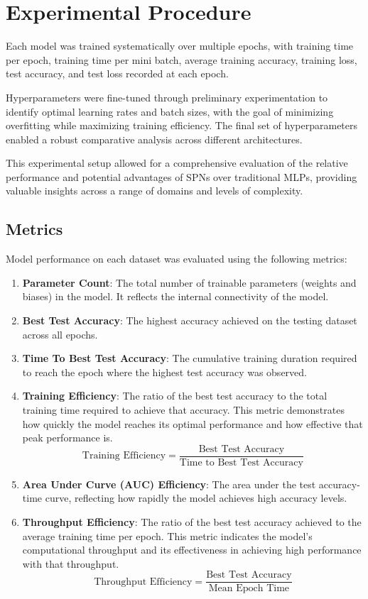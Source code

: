 
\section{Experimental Procedure}

Each model was trained systematically over multiple epochs, with training time per epoch, training time per mini batch, average training accuracy, training loss, test accuracy, and test loss recorded at each epoch.

Hyperparameters were fine-tuned through preliminary experimentation to identify optimal learning rates and batch sizes, with the goal of minimizing overfitting while maximizing training efficiency. The final set of hyperparameters enabled a robust comparative analysis across different architectures.

This experimental setup allowed for a comprehensive evaluation of the relative performance and potential advantages of SPNs over traditional MLPs, providing valuable insights across a range of domains and levels of complexity.

\subsection{Metrics}
Model performance on each dataset was evaluated using the following metrics:
\begin{enumerate}
\item \textbf{Parameter Count}: The total number of trainable parameters (weights and biases) in the model. It reflects the internal connectivity of the model.
\item \textbf{Best Test Accuracy}: The highest accuracy achieved on the testing dataset across all epochs.
\item \textbf{Time To Best Test Accuracy}: The cumulative training duration required to reach the epoch where the highest test accuracy was observed.
\item \textbf{Training Efficiency}: The ratio of the best test accuracy to the total training time required to achieve that accuracy. This metric demonstrates how quickly the model reaches its optimal performance and how effective that peak performance is.
    \[
    \text{Training Efficiency} = \frac{\text{Best Test Accuracy}}{\text{Time to Best Test Accuracy}}
    \]
\item \textbf{Area Under Curve (AUC) Efficiency}: The area under the test accuracy-time curve, reflecting how rapidly the model achieves high accuracy levels.
\item \textbf{Throughput Efficiency}: The ratio of the best test accuracy achieved to the average training time per epoch. This metric indicates the model's computational throughput and its effectiveness in achieving high performance with that throughput.
    \[
    \text{Throughput Efficiency} = \frac{\text{Best Test Accuracy}}{\text{Mean Epoch Time}}
    \]
\end{enumerate}

